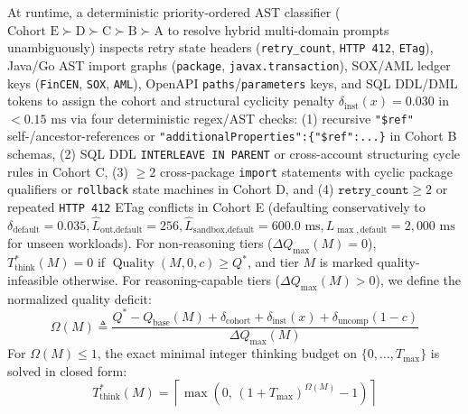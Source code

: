 \documentclass[conference,10pt]{IEEEtran}
\begin{document}
At runtime, a deterministic priority-ordered AST classifier ($\text{Cohort E} \succ \text{D} \succ \text{C} \succ \text{B} \succ \text{A}$ to resolve hybrid multi-domain prompts unambiguously) inspects retry state headers (\texttt{retry\_count}, \texttt{HTTP 412}, \texttt{ETag}), Java/Go AST import graphs (\texttt{package}, \texttt{javax.transaction}), SOX/AML ledger keys (\texttt{FinCEN}, \texttt{SOX}, \texttt{AML}), OpenAPI \texttt{paths}/\texttt{parameters} keys, and SQL DDL/DML tokens to assign the cohort and structural cyclicity penalty $\delta_{\text{inst}}(x) = 0.030$ in $< 0.15\text{ ms}$ via four deterministic regex/AST checks: (1) recursive \texttt{"\$ref"} self-/ancestor-references or \texttt{"additionalProperties":\{"\$ref":...\}} in Cohort B schemas, (2) SQL DDL \texttt{INTERLEAVE IN PARENT} or cross-account structuring cycle rules in Cohort C, (3) $\ge 2$ cross-package \texttt{import} statements with cyclic package qualifiers or \texttt{rollback} state machines in Cohort D, and (4) $\texttt{retry\_count} \ge 2$ or repeated \texttt{HTTP 412} ETag conflicts in Cohort E (defaulting conservatively to $\delta_{\text{default}}=0.035, \hat{L}_{\text{out,default}}=256, \hat{L}_{\text{sandbox,default}}=600.0\text{ ms}, L_{\max,\text{default}}=2{,}000\text{ ms}$ for unseen workloads). For non-reasoning tiers ($\Delta Q_{\max}(M) = 0$), $T_{\text{think}}^*(M) = 0$ if $\operatorname{Quality}(M, 0, c) \ge Q^*$, and tier $M$ is marked quality-infeasible otherwise. For reasoning-capable tiers ($\Delta Q_{\max}(M) > 0$), we define the normalized quality deficit:
\begin{equation}
\label{eq:omega_deficit}
\Omega(M) \triangleq \frac{Q^* - Q_{\text{base}}(M) + \delta_{\text{cohort}} + \delta_{\text{inst}}(x) + \delta_{\text{uncomp}}(1 - c)}{\Delta Q_{\max}(M)}
\end{equation}
For $\Omega(M) \le 1$, the exact minimal integer thinking budget on $\{0, \dots, T_{\max}\}$ is solved in closed form:
\begin{equation}
\label{eq:t_think_opt}
T_{\text{think}}^*(M) = \left\lceil \max\!\left(0,\, (1 + T_{\max})^{\Omega(M)} - 1\right) \right\rceil
\end{equation}
\end{document}
